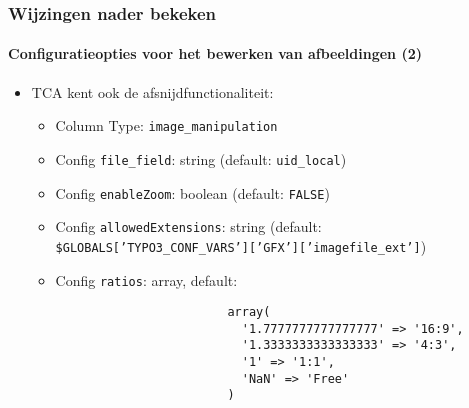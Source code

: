 \begin{frame}[fragile]
	\frametitle{Wijzingen nader bekeken}
	\framesubtitle{Configuratieopties voor het bewerken van afbeeldingen (2)}

	\lstset{basicstyle=\smaller\ttfamily}

	\begin{itemize}
		\item TCA kent ook de afsnijdfunctionaliteit:

			\begin{itemize}
				\item Column Type: \texttt{image\_manipulation}
				\item Config \texttt{file\_field}: string	\tabto{5.6cm}(default: \texttt{uid\_local})
				\item Config \texttt{enableZoom}: boolean	\tabto{5.6cm}(default: \texttt{FALSE})
				\item Config \texttt{allowedExtensions}: string\newline
					(default: \smaller\texttt{\$GLOBALS['TYPO3\_CONF\_VARS']['GFX']['imagefile\_ext']}\small)
				\item Config \texttt{ratios}: array, default:

					\begin{lstlisting}
						array(
						  '1.7777777777777777' => '16:9',
						  '1.3333333333333333' => '4:3',
						  '1' => '1:1',
						  'NaN' => 'Free'
						)
					\end{lstlisting}
			\end{itemize}

	\end{itemize}

\end{frame}

